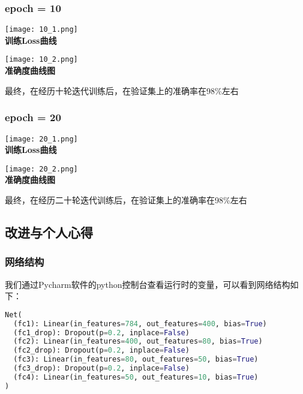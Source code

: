 \documentclass{article}
\begin{document}
\subsubsection{epoch = 10}
\begin{center}
   \texttt{[image: 10\_1.png]}\\
   \normalsize{\textbf{训练Loss曲线}}
\end{center}
\begin{center}
   \texttt{[image: 10\_2.png]}\\
   \normalsize{\textbf{准确度曲线图}}
\end{center}
最终，在经历十轮迭代训练后，在验证集上的准确率在98\%左右
\subsubsection{epoch = 20}
\begin{center}
   \texttt{[image: 20\_1.png]}\\
   \normalsize{\textbf{训练Loss曲线}}
\end{center}
\begin{center}
   \texttt{[image: 20\_2.png]}\\
   \normalsize{\textbf{准确度曲线图}}
\end{center}
最终，在经历二十轮迭代训练后，在验证集上的准确率在98\%左右

\subsection{改进与个人心得}
\subsubsection{网络结构}
我们通过Pycharm软件的python控制台查看运行时的变量，可以看到网络结构如下：
\begin{lstlisting}[language = python]
Net(
  (fc1): Linear(in_features=784, out_features=400, bias=True)
  (fc1_drop): Dropout(p=0.2, inplace=False)
  (fc2): Linear(in_features=400, out_features=80, bias=True)
  (fc2_drop): Dropout(p=0.2, inplace=False)
  (fc3): Linear(in_features=80, out_features=50, bias=True)
  (fc3_drop): Dropout(p=0.2, inplace=False)
  (fc4): Linear(in_features=50, out_features=10, bias=True)
)
\end{lstlisting}
\end{document}
